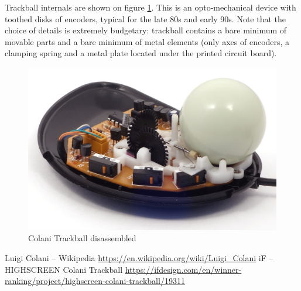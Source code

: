 \documentclass[11pt, a4paper]{article}
\begin{document}
Trackball internals are shown on figure \ref{fig:ColaniInside}. This is an opto-mechanical device with toothed disks of encoders, typical for the late 80s and early 90s. Note that the choice of details is extremely budgetary: trackball contains a bare minimum of movable parts and a bare minimum of metal elements (only axes of encoders, a clamping spring and a metal plate located under the printed circuit board).

\begin{figure}[h]
    \centering
    \includegraphics[scale=0.8]{1993_colani_trackball/inside_30.jpg}
    \caption{Colani Trackball disassembled}
    \label{fig:ColaniInside}
\end{figure}

\begin{thebibliography}{9}
     Luigi Colani – Wikipedia \url{https://en.wikipedia.org/wiki/Luigi_Colani}
     iF – HIGHSCREEN Colani Trackball \url{https://ifdesign.com/en/winner-ranking/project/highscreen-colani-trackball/19311}
\end{thebibliography}
\end{document}
